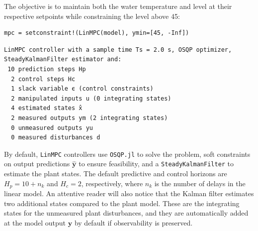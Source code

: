 The objective is to maintain both the water temperature and level at their respective setpoints while constraining the level above 45:
\begin{verbatim}
mpc = setconstraint!(LinMPC(model), ymin=[45, -Inf])
\end{verbatim}
\spacerepl
\begin{verbatim}
LinMPC controller with a sample time Ts = 2.0 s, OSQP optimizer,
SteadyKalmanFilter estimator and:
 10 prediction steps Hp
  2 control steps Hc
  1 slack variable ϵ (control constraints)
  2 manipulated inputs u (0 integrating states)
  4 estimated states x̂
  2 measured outputs ym (2 integrating states)
  0 unmeasured outputs yu
  0 measured disturbances d
\end{verbatim}
By default, \texttt{LinMPC} controllers use \texttt{OSQP.jl} \citep{osqp} to solve the problem, soft constraints on output predictions $\mathbf{\hat y}$ to ensure feasibility, and a \texttt{SteadyKalmanFilter} to estimate the plant states. The default predictive and control horizons are $H_p = 10 + n_k$ and $H_c = 2$, respectively, where $n_k$ is the number of delays in the linear model. An attentive reader will also notice that the Kalman filter estimates two additional states compared to the plant model. These are the integrating states for the unmeasured plant disturbances, and they are automatically added at the model output $\mathbf{y}$ by default if observability is preserved.



